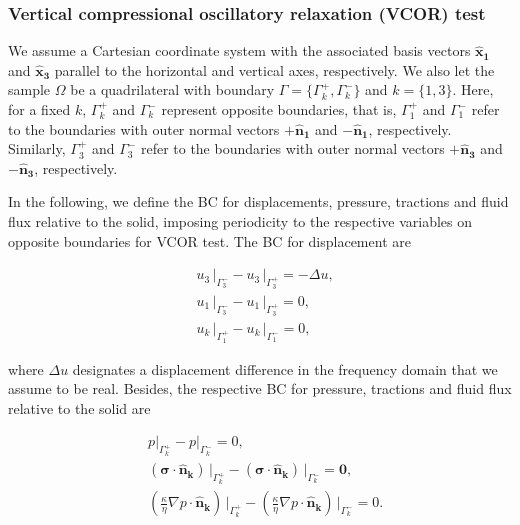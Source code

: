 \documentclass[draft]{agujournal2019}
\begin{document}
\subsubsection{Vertical compressional oscillatory relaxation (VCOR) test}
We assume a Cartesian coordinate system with the associated basis vectors $\bm{\hat x_1}$ and $\bm{\hat x_3}$ parallel to the horizontal and vertical axes, respectively.
We also let the sample $\Omega$ be a quadrilateral with boundary $\Gamma = \{\Gamma_k^+,\Gamma_k^-\}$ and $k=\{1,3\}$. Here, for a fixed $k$, $\Gamma_k^+$ and $\Gamma_k^-$  represent opposite boundaries, 
that is, $\Gamma_1^+$ and $\Gamma_1^-$ 
refer to the boundaries with outer normal vectors $ + \bm{\hat n_1}$ and $- \bm{\hat n_1}$, respectively. Similarly, $\Gamma_3^+$ and $\Gamma_3^-$ refer to the boundaries with outer normal vectors $ + \bm{\hat n_3}$ and $- \bm{\hat n_3}$, respectively.

In the following, we define the BC for displacements, pressure, tractions and fluid flux relative to the solid, imposing periodicity to the respective variables on opposite boundaries for VCOR test.
The BC for displacement are
\begin{linenomath*}
\begin{equation}\label{Eq.8}
\begin{split}
&  u_3 \, \vert_{\Gamma_3^-} - u_3 \, \vert_{\Gamma_3^+} =- \Delta u, \\
&  u_1 \, \vert_{\Gamma_3^-} - u_1 \, \vert_{\Gamma_3^+} = 0, \\
& u_k\,\vert_{\Gamma_1^+} - u_k \,\vert_{\Gamma_1^-} = 0,
\end{split}
\end{equation}
\end{linenomath*}
where $\Delta u$ designates a displacement difference in the frequency domain that we assume to be real.
Besides,  the respective BC for pressure, tractions and fluid flux relative to the solid are
\begin{linenomath*}
\begin{equation}\label{Eq.11}
\begin{split}
& p\vert_{\Gamma_k^+}-p\vert_{\Gamma_k^-} =0, \\
& \left(\bm{\sigma}\cdot \bm{\hat n_k} \right)\, \vert_{\Gamma_k^+}-\left(\bm{\sigma}\cdot \bm{\hat n_k} \right)\, \vert_{\Gamma_k^-} = \bm{0},\\
&\left( \frac{\kappa}{\eta} \nabla p \cdot \bm{\hat n_k} \right) \, \vert_{\Gamma_k^+} -\left( \frac{\kappa}{\eta} \nabla p \cdot \bm{\hat n_k} \right) \, \vert_{\Gamma_k^-} = 0.
\end{split}
\end{equation}
\end{linenomath*}
\end{document}
